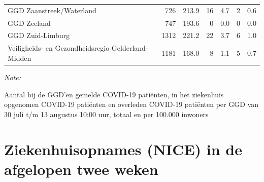 \documentclass[
  english,
  man,floatsintext]{apa6}
\begin{document}
\begin{table}
\begin{threeparttable}
\begin{tabular}{lrrrrrr}
GGD Zaanstreek/Waterland & 726 & 213.9 & 16 & 4.7 & 2 & 0.6\\
GGD Zeeland & 747 & 193.6 & 0 & 0.0 & 0 & 0.0\\
GGD Zuid-Limburg & 1312 & 221.2 & 22 & 3.7 & 6 & 1.0\\
Veiligheids- en Gezondheidsregio Gelderland-Midden & 1181 & 168.0 & 8 & 1.1 & 5 & 0.7\\
\bottomrule
\end{tabular}
\begin{tablenotes}
\item \textit{Note: } 
\item Aantal bij de GGD’en gemelde COVID-19 patiënten, in het ziekenhuis opgenomen COVID-19 patiënten en overleden COVID-19 patiënten per GGD van 30 juli t/m 13 augustus 10:00 uur, totaal en per 100.000 inwoners
\end{tablenotes}
\end{threeparttable}
\endgroup{}
\end{table}

\newpage

\hypertarget{ziekenhuisopnames-nice-in-de-afgelopen-twee-weken}{%
\section{Ziekenhuisopnames (NICE) in de afgelopen twee weken}\label{ziekenhuisopnames-nice-in-de-afgelopen-twee-weken}}
\end{document}
